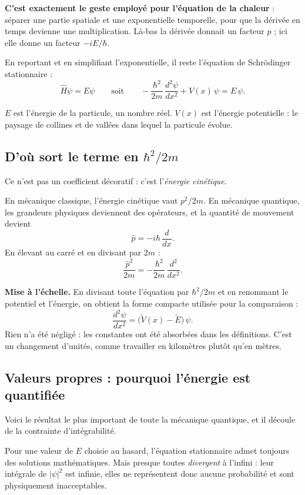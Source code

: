 \documentclass[11pt,a4paper]{article}
\begin{document}
\textbf{C'est exactement le geste employé pour l'équation de la chaleur} : séparer une partie spatiale
et une exponentielle temporelle, pour que la dérivée en temps devienne une multiplication. Là-bas la
dérivée donnait un facteur $p$ ; ici elle donne un facteur $-iE/\hbar$.

En reportant et en simplifiant l'exponentielle, il reste l'équation de Schrödinger stationnaire :
\[ \hat{H}\psi = E\psi
\qquad\text{soit}\qquad
-\frac{\hbar^{2}}{2m}\,\frac{d^{2}\psi}{dx^{2}} + V(x)\,\psi = E\,\psi . \]

$E$ est l'énergie de la particule, un nombre réel. $V(x)$ est l'énergie potentielle : le paysage de
collines et de vallées dans lequel la particule évolue.

\subsection{D'où sort le terme en $\hbar^{2}/2m$}

Ce n'est pas un coefficient décoratif : c'est l'\emph{énergie cinétique}.

En mécanique classique, l'énergie cinétique vaut $p^{2}/2m$. En mécanique quantique, les grandeurs
physiques deviennent des opérateurs, et la quantité de mouvement devient
\[ \hat{p} = -i\hbar\,\frac{d}{dx} . \]
En élevant au carré et en divisant par $2m$ :
\[ \frac{\hat{p}^{2}}{2m} = -\frac{\hbar^{2}}{2m}\,\frac{d^{2}}{dx^{2}} . \]

\textbf{Mise à l'échelle.} En divisant toute l'équation par $\hbar^{2}/2m$ et en renommant le potentiel
et l'énergie, on obtient la forme compacte utilisée pour la comparaison :
\[ \frac{d^{2}\psi}{dx^{2}} = \bigl(\tilde{V}(x) - \tilde{E}\bigr)\,\psi . \]
Rien n'a été négligé : les constantes ont été absorbées dans les définitions. C'est un changement
d'unités, comme travailler en kilomètres plutôt qu'en mètres.

\newpage
\subsection{Valeurs propres : pourquoi l'énergie est quantifiée}

Voici le résultat le plus important de toute la mécanique quantique, et il découle de la contrainte
d'intégrabilité.

Pour une valeur de $E$ choisie au hasard, l'équation stationnaire admet toujours des solutions
mathématiques. Mais presque toutes \emph{divergent} à l'infini : leur intégrale de $|\psi|^{2}$ est
infinie, elles ne représentent donc aucune probabilité et sont physiquement inacceptables.
\end{document}

